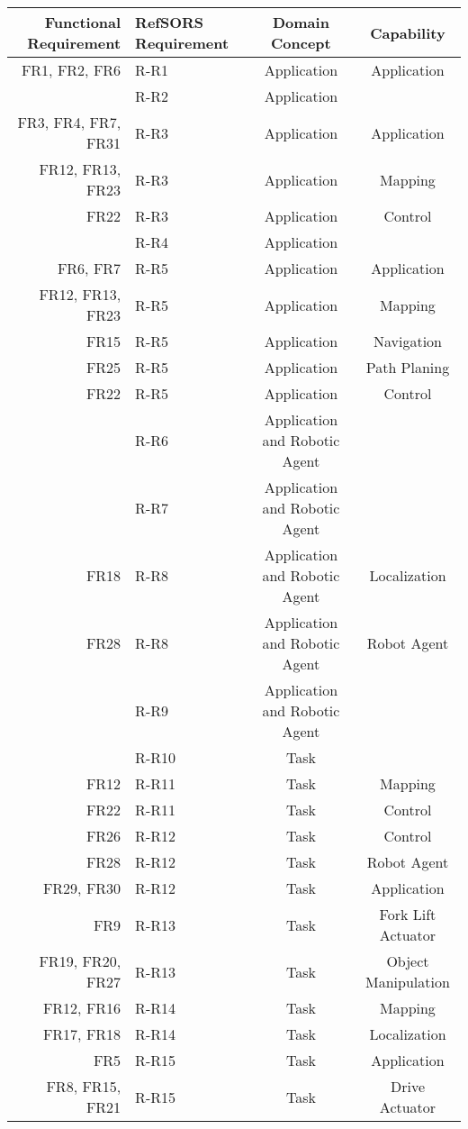 \begin{tabular}{| r | l | c | c |}
	Functional Requirement & RefSORS Requirement & Domain Concept & Capability \\ 
	\hline
	FR1, FR2, FR6 			& R-R1 	& Application & Application \\
							& R-R2 	& Application & \\
	FR3, FR4, FR7, FR31 	& R-R3 	& Application & Application\\
	FR12, FR13, FR23 		& R-R3 	& Application & Mapping\\
	FR22 					& R-R3 	& Application & Control\\ %
							& R-R4 	& Application & \\
	FR6, FR7 				& R-R5 	& Application & Application\\
	FR12, FR13, FR23		& R-R5 	& Application & Mapping\\
	FR15					& R-R5 	& Application & Navigation\\
	FR25					& R-R5 	& Application & Path Planing\\
	FR22					& R-R5 	& Application & Control\\
							& R-R6 	& Application and Robotic Agent & \\
							& R-R7 	& Application and Robotic Agent & \\
	FR18	 				& R-R8 	& Application and Robotic Agent & Localization\\
	FR28 					& R-R8 	& Application and Robotic Agent & Robot Agent\\
							& R-R9 	& Application and Robotic Agent & \\
							& R-R10 & Task & \\
	FR12 					& R-R11 & Task & Mapping\\
	FR22 					& R-R11 & Task & Control\\
	FR26				 	& R-R12 & Task & Control\\
	FR28				 	& R-R12 & Task & Robot Agent\\
	FR29, FR30			 	& R-R12 & Task & Application\\
	FR9 					& R-R13 & Task & Fork Lift Actuator\\
	FR19, FR20, FR27		& R-R13 & Task & Object Manipulation\\
	FR12, FR16				& R-R14 & Task & Mapping\\
	FR17, FR18 				& R-R14 & Task & Localization\\
	FR5 					& R-R15 & Task & Application\\
	FR8, FR15, FR21 		& R-R15 & Task & Drive Actuator\\

\end{tabular}
